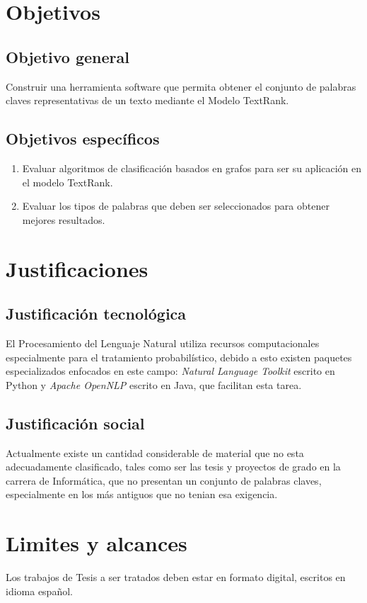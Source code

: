 \section{Objetivos}

\subsection{Objetivo general}
Construir una herramienta software que permita obtener el conjunto de palabras claves
representativas de un texto mediante el Modelo TextRank.

\subsection{Objetivos espec\'ificos}
\begin{enumerate}
	\item Evaluar algoritmos de clasificaci\'on basados en grafos para ser su
	aplicaci\'on en el modelo TextRank.
	\item Evaluar los tipos de palabras que deben ser seleccionados para obtener mejores
	resultados.
\end{enumerate}

\section{Justificaciones}
\subsection{Justificaci\'on tecnol\'ogica}
El Procesamiento del Lenguaje Natural utiliza recursos computacionales especialmente
para el tratamiento probabil\'istico, debido a esto existen paquetes especializados
enfocados en este campo: \emph{Natural Language Toolkit} escrito en Python y
\emph{Apache OpenNLP} escrito en Java, que facilitan esta tarea.

\subsection{Justificaci\'on social}
Actualmente existe un cantidad considerable de material que no esta adecuadamente
clasificado, tales como ser las tesis y proyectos de grado en la carrera de 
Inform\'atica, que no presentan un conjunto de palabras claves, especialmente en
los m\'as antiguos que no tenian esa exigencia.


\section{Limites y alcances}
Los trabajos de Tesis a ser tratados deben estar en formato digital, escritos en 
idioma espa\~nol.
